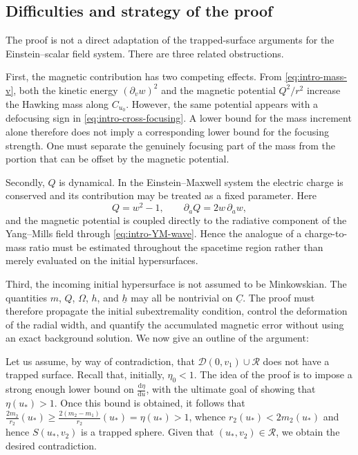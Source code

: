 \documentclass{article}[11pt]
\numberwithin{equation}{section}
\begin{document}
\subsection{Difficulties and strategy of the proof}

The proof is not a direct adaptation of the trapped-surface arguments for
the Einstein--scalar field system. There are three related obstructions.

First, the magnetic contribution has two competing effects. From
\eqref{eq:intro-mass-v}, both the kinetic energy
\((\partial_vw)^2\) and the magnetic potential \(Q^2/r^2\) increase the
Hawking mass along \(C_{u_0}\). However, the same potential appears with a
defocusing sign in \eqref{eq:intro-cross-focusing}. A lower bound for the
mass increment alone therefore does not imply a corresponding lower bound
for the focusing strength. One must separate the genuinely focusing part
of the mass from the portion that can be offset by the magnetic potential.

Secondly, \(Q\) is dynamical. In the Einstein--Maxwell system the electric
charge is conserved and its contribution may be treated as a fixed
parameter. Here
\[
    Q=w^2-1,
    \qquad
    \partial_aQ=2w\,\partial_aw,
\]
and the magnetic potential is coupled directly to the radiative component
of the Yang--Mills field through
\eqref{eq:intro-YM-wave}. Hence the analogue of a charge-to-mass ratio must
be estimated throughout the spacetime region rather than merely evaluated
on the initial hypersurfaces.

Third, the incoming initial hypersurface is not assumed to be Minkowskian.
The quantities \(m\), \(Q\), \(\Omega\), \(h\), and \(\underline h\) may
all be nontrivial on \(\underline C\). The proof must therefore propagate
the initial subextremality condition, control the deformation of the
radial width, and quantify the accumulated magnetic error without using
an exact background solution. We now give an outline of the argument:

\vspace{3mm}
\noindent Let us assume, by way of contradiction, that $\mathcal{D}(0,v_1)\cup \mathcal{R}$ does not have a trapped surface. Recall that, initially, $\eta_0<1$. The idea of the proof is to impose a strong enough lower bound on $\frac{\text{d}\eta}{\text{d}u}$, with the ultimate goal of showing that $\eta(u_*)>1$. Once this bound is obtained, it follows that $\frac{2m_2}{r_2}(u_*)\geq \frac{2(m_2-m_1)}{r_2}(u_*)= \eta(u_*)>1$, whence $r_2(u_*)<2m_2(u_*)$ and hence $S(u_*,v_2)$ is a trapped sphere. Given that $(u_*,v_2)\in \mathcal{R}$, we obtain the desired contradiction.
\end{document}
